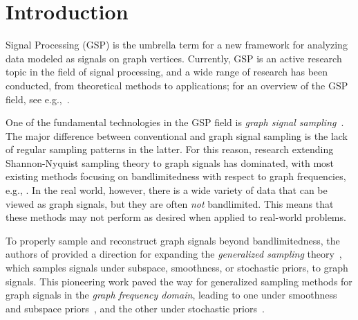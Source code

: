 \documentclass[10pt,journal]{IEEEtran}
\theoremstyle{plain}
\begin{document}
	
	\maketitle
	
	\IEEEdisplaynontitleabstractindextext
	\IEEEpeerreviewmaketitle

\section{Introduction} 
 Signal Processing (GSP) is the umbrella term for a new framework for analyzing data modeled as signals on graph vertices. Currently, GSP is an active research topic in the field of signal processing, and a wide range of research has been conducted, from theoretical methods to applications; for an overview of the GSP field, see e.g.,~\cite{Shuman2013Emerging,sandryhaila2013discrete,Ortega2018Graph}.

One of the fundamental technologies in the GSP field is \textit{graph signal sampling}~\cite{Chen2015Discrete,Tanaka2020Sampling}.
The major difference between conventional and graph signal sampling is the lack of regular sampling patterns in the latter. For this reason, research extending Shannon-Nyquist sampling theory to graph signals has dominated, with most existing methods focusing on bandlimitedness with respect to graph frequencies, e.g., \cite{Chen2015Discrete,marques2015sampling,Anis2016Efficient,tsitsvero2016signals,valsesia2018sampling,tanaka2018spectral,puy2018random,Sakiyama2019Eigendecomposition,bai2020fast,Jayawant2022Practical}. In the real world, however, there is a wide variety of data that can be viewed as graph signals, but they are often \textit{not} bandlimited. This means that these methods may not perform as desired when applied to real-world problems.

To properly sample and reconstruct graph signals beyond bandlimitedness, the authors of \cite{Chepuri2018GraphSamp} provided a direction for expanding the \textit{generalized sampling} theory~\cite{Elder2009Beyond,Eldar2015sampling}, which samples signals under subspace, smoothness, or stochastic priors, to graph signals.
This pioneering work paved the way for generalized sampling methods for graph signals in the \textit{graph frequency domain}, leading to one under smoothness and subspace priors~\cite{Tanaka2020GenSamp}, and the other under stochastic priors~\cite{Hara2023Graph}.
\end{document}
